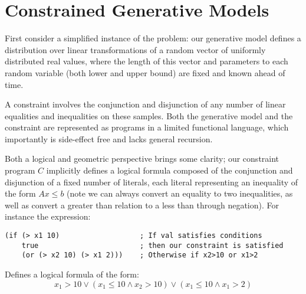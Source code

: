 

\chapter{Constrained Generative Models}


First consider a simplified instance of the problem: our generative model defines a distribution over linear transformations of a random vector of uniformly distributed real values, where the length of this vector and parameters to each random variable (both lower and upper bound) are fixed and known ahead of time.

A constraint involves the conjunction and disjunction of any number of linear equalities and inequalities on these samples.
Both the generative model and the constraint are represented as programs in a limited functional language, which importantly is side-effect free and lacks general recursion.

Both a logical and geometric perspective brings some clarity; our constraint program $C$ implicitly defines a logical formula composed of the conjunction and disjunction of a fixed number of literals, each literal representing an inequality of the form $Ax \le b$ (note we can always convert an equality to two inequalities, as well as convert a greater than relation to a less than through negation).
For instance the expression:

\begin{verbatim}
(if (> x1 10)                   ; If val satisfies conditions
    true                        ; then our constraint is satisfied
    (or (> x2 10) (> x1 2)))    ; Otherwise if x2>10 or x1>2
\end{verbatim}

Defines a logical formula of the form:
\begin{equation}
x_1 > 10 \lor (x_1 \le 10 \land x_2 > 10) \lor (x_1 \le 10 \land x_1 > 2)
\end{equation}

